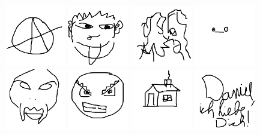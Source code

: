 \includegraphics[width=0.2\textwidth]{art/Safari_52.png}
\includegraphics[width=0.2\textwidth]{art/Safari_53.png}
\includegraphics[width=0.2\textwidth]{art/Safari_54.png}
\includegraphics[width=0.2\textwidth]{art/Safari_55.png}
\includegraphics[width=0.2\textwidth]{art/Safari_56.png}
\includegraphics[width=0.2\textwidth]{art/Safari_57.png}
\includegraphics[width=0.2\textwidth]{art/Safari_58.png}
\includegraphics[width=0.2\textwidth]{art/Safari_59.png}
